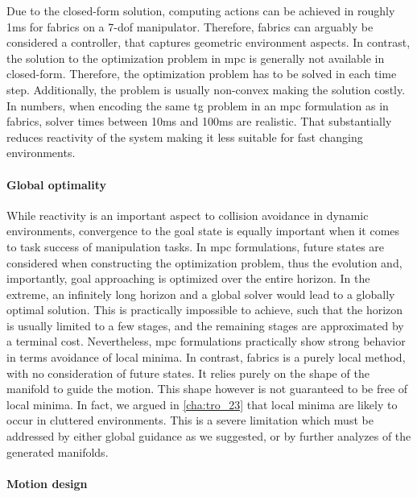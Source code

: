 Due to the closed-form solution, computing actions can be
achieved in roughly 1ms for \ac{fabrics} on a 7-\ac{dof}
manipulator. Therefore, \ac{fabrics} can arguably be
considered a controller, that captures geometric environment
aspects. In contrast, the solution to the optimization
problem in \ac{mpc} is generally not available in
closed-form. Therefore, the optimization problem has to be 
solved in each time step. Additionally, the problem is
usually non-convex making the solution costly. In numbers,
when encoding the same \ac{tg} problem in an \ac{mpc}
formulation as in \ac{fabrics}, solver times between 10ms
and 100ms are realistic. That substantially reduces
reactivity of the system making it less suitable for fast
changing environments.

\paragraph{Global optimality}
\label{par:discussion_global_optimality}

While reactivity is an important aspect to collision
avoidance in dynamic environments, convergence to the goal
state is equally important when it comes to task success of
manipulation tasks. In \ac{mpc} formulations, future states
are considered when constructing the optimization problem,
thus the evolution and, importantly, goal approaching is
optimized over the entire horizon. In the extreme, an
infinitely long horizon and a global solver would lead to a globally optimal
solution. This is practically impossible to achieve, such
that the horizon is usually limited to a few stages, and the
remaining stages are approximated by a terminal cost.
Nevertheless, \ac{mpc} formulations practically show strong 
behavior in terms avoidance of local minima. In contrast,
\ac{fabrics} is a purely local method, with no consideration
of future states. It relies purely on the shape of the
manifold to guide the motion. This shape however is not
guaranteed to be free of local minima. In fact, we argued in 
\cref{cha:tro_23} that local minima are likely to occur in
cluttered environments. This is a severe limitation which
must be addressed by either global guidance as we suggested,
or by further analyzes of the generated manifolds.

\paragraph{Motion design}
\label{par:motion_design}

